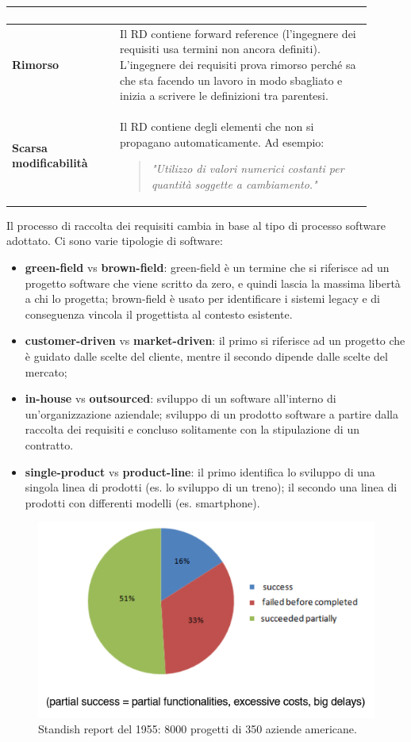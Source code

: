 \begin{longtable}{|m{0.27\linewidth}|m{0.63\linewidth}|}
\begin{verse}
	\end{verse}\\
	\hline
	\textbf{Rimorso} & Il RD contiene forward reference (l'ingegnere dei requisiti usa termini non ancora definiti). L'ingegnere dei requisiti prova rimorso perché sa che sta facendo un lavoro in modo sbagliato e inizia a scrivere le definizioni tra parentesi.\\
	\hline
	\textbf{Scarsa modificabilità} & Il RD contiene degli elementi che non si propagano automaticamente. Ad esempio:
	\begin{verse}
		\textit{"Utilizzo di valori numerici costanti per quantità soggette a cambiamento."}
	\end{verse}
	\\
	\hline
\end{longtable}
Il processo di raccolta dei requisiti cambia in base al tipo di processo software adottato. Ci sono varie tipologie di software:
\begin{itemize}
	\item \textbf{green-field} vs \textbf{brown-field}: green-field è un termine che si riferisce ad un progetto software che viene scritto da zero, e quindi lascia la massima libertà a chi lo progetta; brown-field è usato per identificare i sistemi legacy e di conseguenza vincola il progettista al contesto esistente.
	\item \textbf{customer-driven} vs \textbf{market-driven}: il primo si riferisce ad un progetto che è guidato dalle scelte del cliente, mentre il secondo dipende dalle scelte del mercato;
	\item \textbf{in-house} vs \textbf{outsourced}: sviluppo di un software all'interno di un'organizzazione aziendale; sviluppo di un prodotto software a partire dalla raccolta dei requisiti e concluso solitamente con la stipulazione di un contratto.
	\item \textbf{single-product} vs \textbf{product-line}: il primo identifica lo sviluppo di una singola linea di prodotti (es. lo sviluppo di un treno); il secondo una linea di prodotti con differenti modelli (es. smartphone).
\end{itemize}
\begin{figure}[th]
	\centering
	\includegraphics[width=0.7\linewidth]{img/grafico-torta-problema-requisiti-1955}
	\caption{Standish report del 1955: 8000 progetti di 350 aziende americane.}
	\label{fig:grafico-torta-problema-requisiti-1955}
\end{figure}

